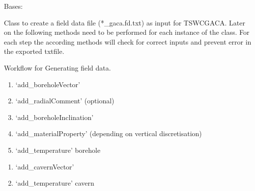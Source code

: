 \documentclass[letterpaper,10pt,english]{sphinxmanual}
\begin{document}
\begin{fulllineitems}
\label{\detokenize{tscw_module:tscw_module.tscw_DataClassesInput.GacaFieldData}}
\pysigstartsignatures
{}
\pysigstopsignatures
\sphinxAtStartPar
Bases: 

\sphinxAtStartPar
Class to create a field data file (*\_gaca.fd.txt) as input for TSWC\sphinxhyphen{}GACA.
Later on the following methods need to be performed for each instance of the class.
For each step the according methods will check for correct inputs and prevent error in the exported txt\sphinxhyphen{}file.

\sphinxAtStartPar
Workflow for Generating field data.
\begin{description}
\begin{enumerate}
%
\item {} 
\sphinxAtStartPar
‘add\_boreholeVector’

\item {} 
\sphinxAtStartPar
‘add\_radialComment’ (optional)

\item {} 
\sphinxAtStartPar
‘add\_boreholeInclination’

\item {} 
\sphinxAtStartPar
‘add\_materialProperty’ (depending on vertical discretisation)

\item {} 
\sphinxAtStartPar
‘add\_temperature’ \sphinxhyphen{} borehole

\end{enumerate}

\begin{enumerate}
%
\item {} 
\sphinxAtStartPar
‘add\_cavernVector’

\item {} 
\sphinxAtStartPar
‘add\_temperature’ \sphinxhyphen{} cavern


\end{enumerate}
\end{description}
\end{fulllineitems}
\end{document}
